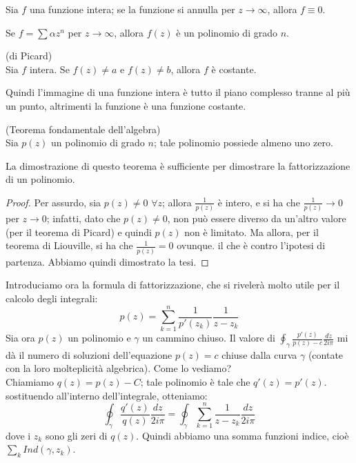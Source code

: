 \begin{corollario}
Sia $f$ una funzione intera; se la funzione si annulla per $z \to \infty$, allora $f \equiv 0$.
\end{corollario}
\begin{corollario}
Se $f = \sum \alpha z^n$ per $z \to \infty$, allora $f(z)$ è un polinomio di grado $n$.
\end{corollario}
\begin{teorema} (di Picard)\\
Sia $f$ intera. Se $f(z) \neq a$ e $f(z) \neq b$, allora $f$ è costante.
\end{teorema}
Quindi l'immagine di una funzione intera è tutto il piano complesso tranne al più un punto, altrimenti la funzione è una funzione costante.
\begin{teorema} (Teorema fondamentale dell'algebra)\\
Sia $p(z)$ un polinomio di grado $n$; tale polinomio possiede almeno uno zero.
\end{teorema}
La dimostrazione di questo teorema è sufficiente per dimostrare la fattorizzazione di un polinomio.
\begin{proof}
Per assurdo, sia $p(z) \neq 0$ $\forall z$; allora $\frac{1}{p(z)}$ è intero, e si ha che $\frac{1}{p(z)} \to 0$ per $z \to 0$; infatti, dato che $p(z) \neq 0$, non può essere diverso da un'altro valore (per il teorema di Picard) e quindi $p(z)$ non è limitato. Ma allora, per il teorema di Liouville, si ha che $\frac{1}{p(z)}=0$ ovunque. il che è contro l'ipotesi di partenza. Abbiamo quindi dimostrato la tesi.
\end{proof}

Introduciamo ora la formula di fattorizzazione, che si rivelerà molto utile per il calcolo degli integrali:
\begin{equation}
p(z)=\sum_{k=1} ^n \frac{1}{p'(z_k)} \frac{1}{z-z_k}
\end{equation}
Sia ora $p(z)$ un polinomio e $\gamma$ un cammino chiuso. Il valore di $\oint_{\gamma} \frac{p'(z)}{p(z)-c} \frac{dz}{2 i \pi} $ mi dà il numero di soluzioni dell'equazione $p(z)=c$ chiuse dalla curva $\gamma$ (contate con la loro molteplicità algebrica). Come lo vediamo? \\ Chiamiamo $q(z)=p(z)-C$; tale polinomio è tale che $q'(z)=p'(z)$. sostituendo all'interno dell'integrale, otteniamo:
$$\oint_{\gamma} \frac{q'(z)}{q(z)} \frac{dz}{2 i \pi}=\oint_{\gamma} \sum_{k=1} ^n \frac{1}{z-z_k} \frac{dz}{2 i \pi}$$
dove i $z_k$ sono gli zeri di $q(z)$.
Quindi abbiamo una somma funzioni indice, cioè $\sum_k Ind(\gamma,z_k)$.

